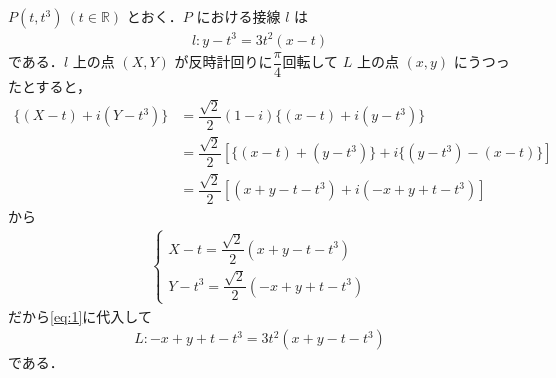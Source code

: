 \documentclass[../../main.tex]{subfiles}
\begin{document}
$P(t, t^3)\ (t \in \mathbb{R})$ とおく．$P$ における接線 $l$ は
\begin{align}
  l: y - t^3 = 3t^2(x - t) \label{eq:1}
\end{align}
である．$l$ 上の点 $(X,Y)$ が反時計回りに$\dfrac{\pi}{4}$回転して $L$ 上の点 $(x,y)$ にうつったとすると，
\begin{align}
  \{ (X-t) + i(Y-t^3) \}
  &= \dfrac{\sqrt{2}}{2}(1-i) \{ (x-t) + i(y-t^3) \} \\
  &= \dfrac{\sqrt{2}}{2} \left[ \{ (x-t) + (y-t^3) \} + i \{ (y-t^3) - (x-t) \} \right] \\
  &= \dfrac{\sqrt{2}}{2} \left[ (x+y-t-t^3) + i (-x+y+t-t^3) \right]
\end{align}
から
\begin{align}
  \begin{cases}
    X-t = \dfrac{\sqrt{2}}{2}(x+y-t-t^3) \\
    Y-t^3 = \dfrac{\sqrt{2}}{2}(-x+y+t-t^3)
  \end{cases} \label{eq:2}
\end{align}
だから\cref{eq:1}に代入して
\begin{align}
  L: -x+y+t-t^3 = 3t^2 (x+y-t-t^3) \label{eq:3}
\end{align}
である．
\end{document}
